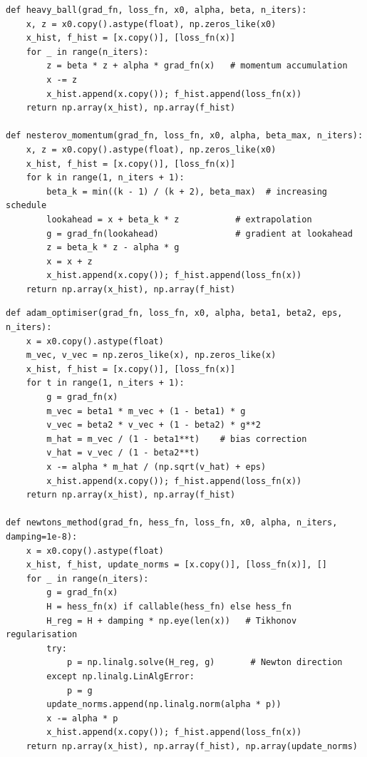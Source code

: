 \documentclass[11pt,a4paper]{article}
\theoremstyle{definition}
\begin{document}
\begin{lstlisting}[caption={Heavy Ball and Nesterov Momentum}]
def heavy_ball(grad_fn, loss_fn, x0, alpha, beta, n_iters):
    x, z = x0.copy().astype(float), np.zeros_like(x0)
    x_hist, f_hist = [x.copy()], [loss_fn(x)]
    for _ in range(n_iters):
        z = beta * z + alpha * grad_fn(x)   # momentum accumulation
        x -= z
        x_hist.append(x.copy()); f_hist.append(loss_fn(x))
    return np.array(x_hist), np.array(f_hist)

def nesterov_momentum(grad_fn, loss_fn, x0, alpha, beta_max, n_iters):
    x, z = x0.copy().astype(float), np.zeros_like(x0)
    x_hist, f_hist = [x.copy()], [loss_fn(x)]
    for k in range(1, n_iters + 1):
        beta_k = min((k - 1) / (k + 2), beta_max)  # increasing schedule
        lookahead = x + beta_k * z           # extrapolation
        g = grad_fn(lookahead)               # gradient at lookahead
        z = beta_k * z - alpha * g
        x = x + z
        x_hist.append(x.copy()); f_hist.append(loss_fn(x))
    return np.array(x_hist), np.array(f_hist)
\end{lstlisting}

\begin{lstlisting}[caption={Adam Optimiser and Newton's Method}]
def adam_optimiser(grad_fn, loss_fn, x0, alpha, beta1, beta2, eps, n_iters):
    x = x0.copy().astype(float)
    m_vec, v_vec = np.zeros_like(x), np.zeros_like(x)
    x_hist, f_hist = [x.copy()], [loss_fn(x)]
    for t in range(1, n_iters + 1):
        g = grad_fn(x)
        m_vec = beta1 * m_vec + (1 - beta1) * g
        v_vec = beta2 * v_vec + (1 - beta2) * g**2
        m_hat = m_vec / (1 - beta1**t)    # bias correction
        v_hat = v_vec / (1 - beta2**t)
        x -= alpha * m_hat / (np.sqrt(v_hat) + eps)
        x_hist.append(x.copy()); f_hist.append(loss_fn(x))
    return np.array(x_hist), np.array(f_hist)

def newtons_method(grad_fn, hess_fn, loss_fn, x0, alpha, n_iters, damping=1e-8):
    x = x0.copy().astype(float)
    x_hist, f_hist, update_norms = [x.copy()], [loss_fn(x)], []
    for _ in range(n_iters):
        g = grad_fn(x)
        H = hess_fn(x) if callable(hess_fn) else hess_fn
        H_reg = H + damping * np.eye(len(x))   # Tikhonov regularisation
        try:
            p = np.linalg.solve(H_reg, g)       # Newton direction
        except np.linalg.LinAlgError:
            p = g
        update_norms.append(np.linalg.norm(alpha * p))
        x -= alpha * p
        x_hist.append(x.copy()); f_hist.append(loss_fn(x))
    return np.array(x_hist), np.array(f_hist), np.array(update_norms)
\end{lstlisting}
\end{document}
